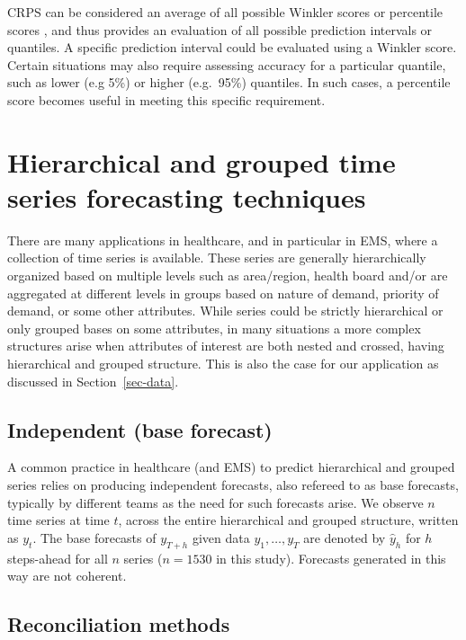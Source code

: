 \documentclass[
  authoryear,
  preprint,
  3p]{elsarticle}
\begin{document}
CRPS can be considered an average of all possible Winkler scores
\citep[Section 5.9]{winkler1972decision, hyndman2021forecasting} or
percentile scores \citep[Section 5.9]{hyndman2021forecasting}, and thus
provides an evaluation of all possible prediction intervals or
quantiles. A specific prediction interval could be evaluated using a
Winkler score. Certain situations may also require assessing accuracy
for a particular quantile, such as lower (e.g 5\%) or higher (e.g.~95\%)
quantiles. In such cases, a percentile score becomes useful in meeting
this specific requirement.

\hypertarget{sec-htc}{%
\section{Hierarchical and grouped time series forecasting
techniques}\label{sec-htc}}

There are many applications in healthcare, and in particular in EMS,
where a collection of time series is available. These series are
generally hierarchically organized based on multiple levels such as
area/region, health board and/or are aggregated at different levels in
groups based on nature of demand, priority of demand, or some other
attributes. While series could be strictly hierarchical or only grouped
bases on some attributes, in many situations a more complex structures
arise when attributes of interest are both nested and crossed, having
hierarchical and grouped structure. This is also the case for our
application as discussed in Section~\ref{sec-data}.

\hypertarget{independent-base-forecast}{%
\subsection{Independent (base
forecast)}\label{independent-base-forecast}}

A common practice in healthcare (and EMS) to predict hierarchical and
grouped series relies on producing independent forecasts, also refereed
to as base forecasts, typically by different teams as the need for such
forecasts arise. We observe \(n\) time series at time \(t\), across the
entire hierarchical and grouped structure, written as \(y_t\). The base
forecasts of \(y_{T+h}\) given data \(y_1,\dots,y_T\) are denoted by
\(\hat{y}_h\) for \(h\) steps-ahead for all \(n\) series (\(n=1530\) in
this study). Forecasts generated in this way are not coherent.

\hypertarget{reconciliation-methods}{%
\subsection{Reconciliation methods}\label{reconciliation-methods}}
\end{document}
